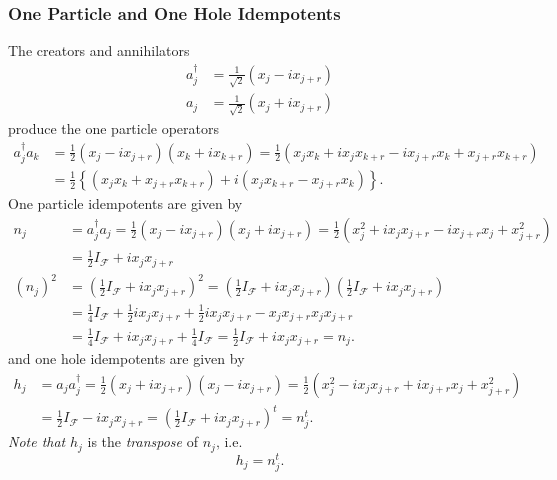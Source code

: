 \documentclass[aps, preprint]{revtex4}
\begin{document}
\subsubsection{One Particle and One Hole Idempotents}
The creators and annihilators
\begin{align}a_{j}^{ \dag } &  =\frac{1}{\sqrt{2}} \left (x_{j} -i x_{j +r}\right ) \\
a_{j} &  =\frac{1}{\sqrt{2}} \left (x_{j} +i x_{j +r}\right )\end{align}produce the one particle operators
\begin{align}a_{j}^{ \dag } a_{k} &  =\frac{1}{2} \left (x_{j} -i x_{j +r}\right ) \left (x_{k} +i x_{k +r}\right ) =\frac{1}{2} \left (x_{j} x_{k} +i x_{j} x_{k +r} -i x_{j +r} x_{k} +x_{j +r} x_{k +r}\right ) \\
 &  =\frac{1}{2} \left \{\left (x_{j} x_{k} +x_{j +r} x_{k +r}\right ) +i \left (x_{j} x_{k +r} -x_{j +r} x_{k}\right )\right \}\text{.}\end{align}One particle idempotents are given by
\begin{align}n_{j} &  =a_{j}^{ \dag } a_{j} =\frac{1}{2} \left (x_{j} -i x_{j +r}\right ) \left (x_{j} +i x_{j +r}\right ) =\frac{1}{2} \left (x_{j}^{2} +i x_{j} x_{j +r} -i x_{j +r} x_{j} +x_{j +r}^{2}\right ) \\
 &  =\frac{1}{2} I_{\mathcal{F}} +i x_{j} x_{j +r} \\
\left (n_{j}\right )^{2} &  =\left (\frac{1}{2} I_{\mathcal{F}} +i x_{j} x_{j +r}\right )^{2} =\left (\frac{1}{2} I_{\mathcal{F}} +i x_{j} x_{j +r}\right ) \left (\frac{1}{2} I_{\mathcal{F}} +i x_{j} x_{j +r}\right ) \\
 &  =\frac{1}{4} I_{\mathcal{F}} +\frac{1}{2} i x_{j} x_{j +r} +\frac{1}{2} i x_{j} x_{j +r} -x_{j} x_{j +r} x_{j} x_{j +r} \\
 &  =\frac{1}{4} I_{\mathcal{F}} +i x_{j} x_{j +r} +\frac{1}{4} I_{\mathcal{F}} =\frac{1}{2} I_{\mathcal{F}} +i x_{j} x_{j +r} =n_{j}\text{.}\end{align}and one hole idempotents are given by
\begin{align}h_{j} &  =a_{j} a_{j}^{ \dag } =\frac{1}{2} \left (x_{j} +i x_{j +r}\right ) \left (x_{j} -i x_{j +r}\right ) =\frac{1}{2} \left (x_{j}^{2} -i x_{j} x_{j +r} +i x_{j +r} x_{j} +x_{j +r}^{2}\right ) \\
 &  =\frac{1}{2} I_{\mathcal{F}} -i x_{j} x_{j +r} =\left (\frac{1}{2} I_{\mathcal{F}} +i x_{j} x_{j +r}\right )^{t} =n_{j}^{t}\text{.}\end{align}\emph{Note that }$h_{j}$ is the \emph{transpose} of $n_{j}\text{,}$ i.e.
\begin{equation}h_{j} =n_{j}^{t}\text{.}
\end{equation}
\end{document}
